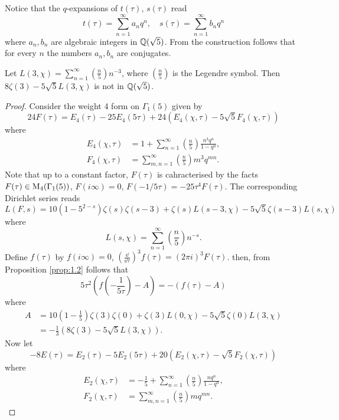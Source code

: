 Notice that the $q$-expansions of $t(\tau)$, $s(\tau)$ read
$$
    t(\tau) = \sum_{n=1}^{\infty} a_n q^n, \quad s(\tau) = \sum_{n=1}^{\infty} b_n q^n
$$
where $a_n, b_n$ are algebraic integers in $\mathbb{Q}(\sqrt{5})$.
From the construction follows that for every $n$ the numbers $a_n, b_n$ are conjugates.

\begin{theorem}
\label{thm:4}
Let $L(3, \chi) = \sum_{n=1}^{\infty} \left(\frac{n}{5}\right) n^{-3}$, where $\left(\frac{n}{5}\right)$ is the Legendre symbol.
Then $8\zeta(3) - 5\sqrt{5}L(3, \chi)$ is not in $\mathbb{Q}(\sqrt{5})$.
\end{theorem}

\begin{proof}
Consider the weight 4 form on $\Gamma_1(5)$ given by
$$
    24 F(\tau) = E_4(\tau) - 25 E_4(5\tau) + 24(E_4(\chi, \tau) - 5\sqrt{5} F_4(\chi, \tau))
$$
where
\begin{align*}
    E_4(\chi, \tau) &= 1 + \sum_{n=1}^{\infty} \left(\frac{n}{5}\right) \frac{n^3 q^n}{1 - q^n}, \\
    F_4(\chi, \tau) &= \sum_{m, n=1}^{\infty} \left(\frac{n}{5}\right) m^3  q^{mn}.
\end{align*}
Note that up to a constant factor, $F(\tau)$ is cahracterised by the facts $F(\tau) \in \mathrm{M}_4(\Gamma_1(5))$, $F(i\infty) = 0$, $F(-1/5\tau) = -25 \tau^4 F(\tau)$.
The corresponding Dirichlet series reads
$$
    L(F, s) = 10 (1 - 5^{2-s})\zeta(s) \zeta(s - 3) + \zeta(s) L(s - 3, \chi) - 5\sqrt{5} \zeta(s - 3) L(s, \chi)
$$
where
$$
    L(s, \chi) = \sum_{n=1}^{\infty} \left(\frac{n}{5}\right) n^{-s}.
$$
Define $f(\tau)$ by $f(i\infty) = 0$, $\left(\frac{\dd}{\dd \tau}\right)^{3} f(\tau) = (2\pi i)^3 F(\tau)$.
then, from Proposition \ref{prop:1.2} follows that
$$
    5 \tau^2 \left(f\left(-\frac{1}{5\tau}\right) - A\right) = - (f(\tau) - A)
$$
where
\begin{align*}
    A &= 10\left(1 - \frac{1}{5}\right) \zeta(3) \zeta(0) + \zeta(3) L(0, \chi) - 5\sqrt{5} \zeta(0) L(3, \chi) \\
    &= -\frac{1}{3} (8\zeta(3) - 5\sqrt{5} L(3, \chi)).
\end{align*}
Now let 
$$
    -8 E(\tau) = E_2(\tau) - 5 E_2(5\tau) + 20 (E_2(\chi, \tau) - \sqrt{5} F_2(\chi, \tau))
$$
where
\begin{align*}
    E_2(\chi, \tau) &= -\frac{1}{5} + \sum_{n=1}^{\infty} \left(\frac{n}{5}\right) \frac{n q^n}{1 - q^n}, \\
    F_2(\chi, \tau) &= \sum_{m, n=1}^{\infty} \left(\frac{n}{5}\right) m q^{mn}.

\end{align*}
\end{proof}
